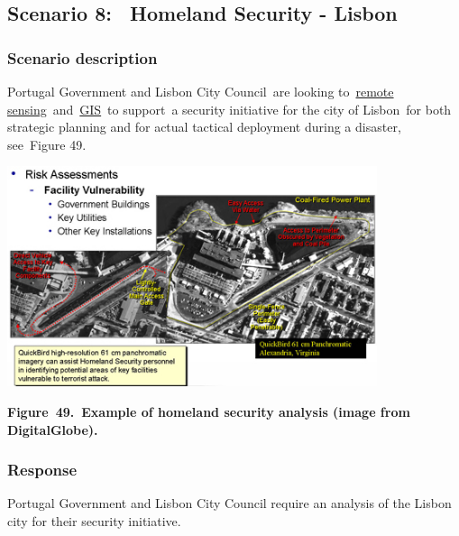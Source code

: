 \documentclass[a4paper]{article}
\begin{document}
\bigskip


\bigskip

\clearpage
\bigskip

\subsection[Scenario 8: \ Homeland Security {}- Lisbon]{Scenario 8:
\ Homeland Security - Lisbon}
\hypertarget{Toc381777271}{}\subsubsection[Scenario
description]{Scenario description}
\hypertarget{Toc381777272}{}\foreignlanguage{english}{Portugal
Government and Lisbon City Council\ }\foreignlanguage{english}{are
looking
to~}\href{http://www.satimagingcorp.com/services.html}{\foreignlanguage{english}{remote
sensing}}\foreignlanguage{english}{~and~}\href{http://www.satimagingcorp.com/svc/gismapping.html}{\foreignlanguage{english}{GIS}}\foreignlanguage{english}{~to
support\ }\foreignlanguage{english}{a security initiative for the city
of Lisbon\ }\foreignlanguage{english}{for both strategic planning and
for actual tactical deployment during a
disaster}\foreignlanguage{english}{, see\ }Figure
49\foreignlanguage{english}{.}\foreignlanguage{english}{\ }


\bigskip

{\centering 
\includegraphics[width=4.26943in,height=2.54242in]{out-img57.jpg} \par}

{\centering\bfseries
\label{bkm:Ref377555206}Figure\ 49.\ Example of homeland security
analysis (image from DigitalGlobe).
\par}


\bigskip

\subsubsection[Response]{ Response}
\hypertarget{Toc381777273}{}{
Portugal Government and Lisbon City Council require an analysis of the
Lisbon city for their security initiative.}
\end{document}
